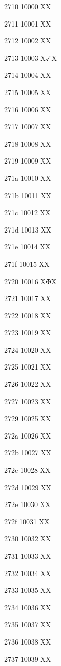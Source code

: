 \documentclass[11pt]{article}
\begin{document}
2710 10000 X{}X

2711 10001 X{}X

2712 10002 X{}X

2713 10003 X{\ensuremath{\checkmark}}X

2714 10004 X{}X

2715 10005 X{}X

2716 10006 X{}X

2717 10007 X{}X

2718 10008 X{}X

2719 10009 X{}X

271a 10010 X{}X

271b 10011 X{}X

271c 10012 X{}X

271d 10013 X{}X

271e 10014 X{}X

271f 10015 X{}X

2720 10016 X{\ensuremath{\maltese}}X

2721 10017 X{}X

2722 10018 X{}X

2723 10019 X{}X

2724 10020 X{}X

2725 10021 X{}X

2726 10022 X{}X

2727 10023 X{}X

2729 10025 X{}X

272a 10026 X{}X

272b 10027 X{}X

272c 10028 X{}X

272d 10029 X{}X

272e 10030 X{}X

272f 10031 X{}X

2730 10032 X{}X

2731 10033 X{}X

2732 10034 X{}X

2733 10035 X{}X

2734 10036 X{}X

2735 10037 X{}X

2736 10038 X{}X

2737 10039 X{}X
\end{document}
